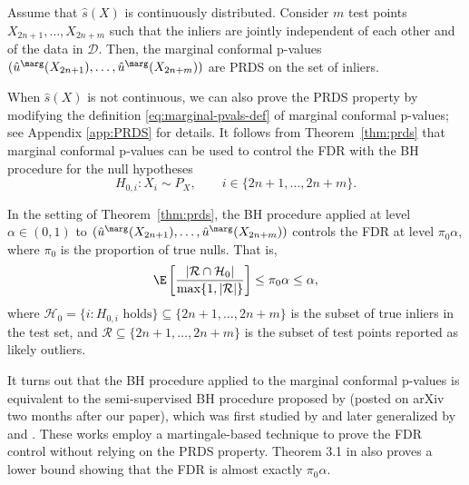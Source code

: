 \begin{thm} \label{thm:prds}
{Assume that $\hat{s}(X)$ is continuously distributed.} Consider $m$ test points $X_{2n+1},\dots,X_{2n+m}$ such that the inliers are jointly independent of each other and of the data in $\mathcal{D}$. Then, the marginal conformal p-values $(\hat{u}^\marg(X_{2n+1}),\dots,\hat{u}^\marg(X_{2n+m}))$ are PRDS on the set of inliers.
\end{thm}
{When $\hat{s}(X)$ is not continuous, we can also prove the PRDS property by modifying the definition \eqref{eq:marginal-pvals-def} of marginal conformal p-values; see Appendix \ref{app:PRDS} for details. }It follows from Theorem~\ref{thm:prds} that marginal conformal p-values can be used to control the FDR with the BH procedure for the null hypotheses
\begin{equation*}
    H_{0,i} : X_i \sim P_X, \qquad i \in \{2n+1,\dots,2n+m\}.
\end{equation*}
\begin{cor}\label{cor:BH_FDR}
In the setting of Theorem~\ref{thm:prds}, the BH procedure applied at level $\alpha \in (0,1)$ to $(\hat{u}^\marg(X_{2n+1}),\dots,\hat{u}^\marg(X_{2n+m}))$ controls the FDR at level $\pi_0\alpha$, where $\pi_0$ is the proportion of true nulls. That is,
\begin{equation}
    \E\left[\frac{|\mathcal{R} \cap \mathcal{H}_0|}{\max\{1, |\mathcal{R}|\} } \right] \le \pi_0\alpha\le \alpha,
\end{equation}
where $\mathcal{H}_0 = \{i : H_{0,i} \text{ holds}\} \subseteq \{2n+1,\dots,2n+m\}$ is the subset of true inliers in the test set, and $\mathcal{R} \subseteq \{2n+1,\dots,2n+m\}$ is the subset of test points reported as likely outliers.
\end{cor}

\begin{remark}
It turns out that the BH procedure applied to the marginal conformal p-values is equivalent to the semi-supervised BH procedure proposed by \cite{mary2021semi} (posted on arXiv two months after our paper), which was first studied by \cite{weinstein2017power} and later generalized by \cite{yang2021bonus} and \cite{rava2021burden}. These works employ a martingale-based technique to prove the FDR control without relying on the PRDS property. Theorem 3.1 in \cite{mary2021semi} also proves a lower bound showing that the FDR is almost exactly $\pi_0 \alpha$.
\end{remark}


